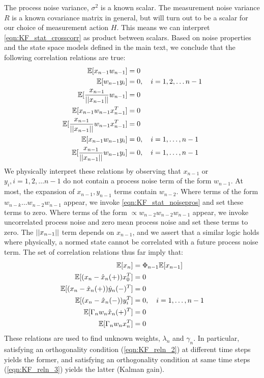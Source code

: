 The process noise variance, $\sigma^2$ is a known scalar. The measurement noise variance $R$ is a known covariance matrix in general, but will turn out to be a scalar for our choice of measurement action $H$. This means we can interpret \ref{eqn:KF_stat_crosscorr} as product between scalars. Based on noise properties and the state space models defined in the main text, we conclude that the following correlation relations are true:
\begin{align}
\mathbb{E}[x_{n-1}w_{n-1}] & = 0 \label{eqn:KF_reln_4}\\
\mathbb{E}[w_{n-1} y_i] &= 0, \quad i = 1,2,\dots n-1 \label{eqn:KF_reln_5}\\
\mathbb{E}[\frac{x_{n-1}}{||x_{n-1}||}w_{n-1}] & = 0 \label{eqn:KF_reln_6}\\
\mathbb{E}[x_{n-1} w_{n-1} x_{n-1}^T ] & = 0 \label{eqn:KF_reln_7}\\
\mathbb{E}[\frac{x_{n-1}}{||x_{n-1}||} w_{n-1} x_{n-1}^T ] & = 0 \label{eqn:KF_reln_8} \\
\mathbb{E}[x_{n-1} w_{n-1} y_i ] & = 0, \quad i = 1,\dots, n-1 \label{eqn:KF_reln_9}\\
\mathbb{E}[\frac{x_{n-1}}{||x_{n-1}||} w_{n-1} y_i ] & = 0, \quad i = 1,\dots, n-1 \label{eqn:KF_reln_10}
\end{align} We physically interpret these relations by observing that $x_{n-1}$ or $y_i, i = 1,2,\dots n-1$ do not contain a process noise term of the form $w_{n-1}$. At most, the expansion of $x_{n-1}, y_{n-1}$ terms contain $w_{n-2}$. Where terms of the form $w_{n-k}\dots w_{n-2}w_{n-1}$ appear, we invoke \ref{eqn:KF_stat_noisepros} and set these terms to zero. Where terms of the form $\propto w_{n-2}w_{n-2}w_{n-1}$ appear, we invoke uncorrelated process noise and zero mean process noise and set these terms to zero. The $||x_{n-1}||$ term depends on $x_{n-1}$, and we assert that a similar logic holds where physically, a normed state cannot be correlated with a future process noise term. The set of correlation relations thus far imply that:
\begin{align}
\mathbb{E}[x_n] &= \Phi_{n-1}\mathbb{E}[x_{n-1}] \label{eqn:KF_reln_11}\\
\mathbb{E}[(x_n - \hat{x}_{n}(+))x_0^T] &= 0 \label{eqn:KF_reln_12}\\
\mathbb{E}[(x_n - \hat{x}_{n}(+))\hat{y}_n(-)^T] &=0 \label{eqn:KF_reln_13} \\
\mathbb{E}[(x_n - \hat{x}_{n}(-))y_i^T] &=0, \quad i = 1,\dots, n-1\label{eqn:KF_reln_14}\\
\mathbb{E}[\Gamma_n w_n \hat{x}_{n}(+)^T] &=0 \label{eqn:KF_reln_16}\\
\mathbb{E}[\Gamma_n w_n x_n^T] &=0 \label{eqn:KF_reln_17} 
\end{align}
These relations are used to find unknown weights, $\lambda_n$ and $\gamma_n$. In particular, satisfying an orthogonality condition (\cref{eqn:KF_reln_2}) at different time steps yields the former, and satisfying an orthogonality condition at same time steps (\cref{eqn:KF_reln_3}) yields the latter (Kalman gain). 

